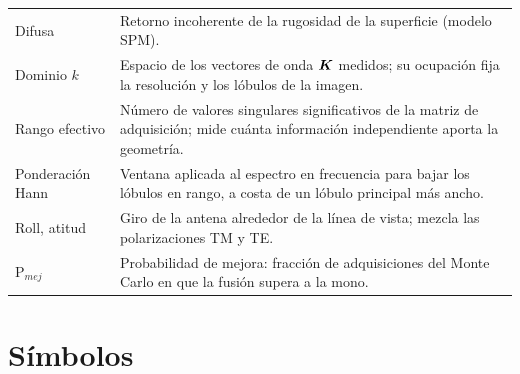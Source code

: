 \begin{longtable}{@{}L{2.8cm}L{11.6cm}@{}}
Difusa & Retorno incoherente de la rugosidad de la superficie (modelo SPM). \\
Dominio $k$ & Espacio de los vectores de onda $\bm{K}$ medidos; su ocupación fija la resolución
              y los lóbulos de la imagen. \\
Rango efectivo & Número de valores singulares significativos de la matriz de adquisición;
                 mide cuánta información independiente aporta la geometría. \\
Ponderación Hann & Ventana aplicada al espectro en frecuencia para bajar los lóbulos en rango,
                   a costa de un lóbulo principal más ancho. \\
Roll, atitud & Giro de la antena alrededor de la línea de vista; mezcla las polarizaciones TM y TE. \\
P$_{mej}$ & Probabilidad de mejora: fracción de adquisiciones del Monte Carlo en que la fusión
            supera a la mono. \\
\bottomrule
\end{longtable}

\section*{Símbolos}

